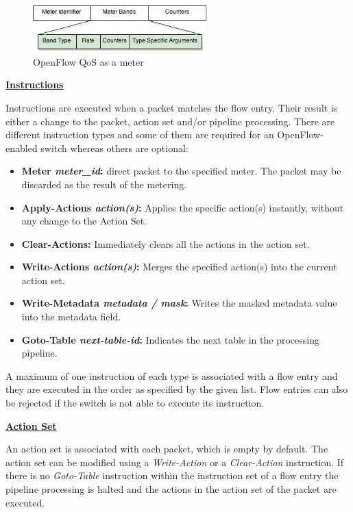 \begin{figure}[H]
\centering
\includegraphics[width=0.6\textwidth]{images/fundamentals/openflow_qos.png}
\caption{OpenFlow QoS as a meter}
\end{figure}


\underline{\textbf{Instructions}}

Instructions are executed when a packet matches the flow entry. Their result is either a change to the packet, action set and/or pipeline processing. There are different instruction types and some of them are required for an OpenFlow-enabled switch whereas others are optional:

\begin{itemize}
\item \textbf{Meter \textit{meter\_id}:} direct packet to the specified meter. The packet may be discarded as the result of the metering.
\item \textbf{Apply-Actions \textit{action(s)}:} Applies the specific action(s) instantly, without any change to the Action Set.
\item \textbf{Clear-Actions:} Immediately clears all the actions in the action set.
\item \textbf{Write-Actions \textit{action(s)}:} Merges the specified action(s) into the current action set.
\item \textbf{Write-Metadata \textit{metadata / mask}:} Writes the masked metadata value into the metadata field.
\item \textbf{Goto-Table \textit{next-table-id}:} Indicates the next table in the processing pipeline.
\end{itemize}

A maximum of one instruction of each type is associated with a flow entry and they are executed in the order as specified by the given list. Flow entries can also be rejected if the switch is not able to execute its instruction.


\underline{\textbf{Action Set}}

An action set is associated with each packet, which is empty by default. The action set can be modified using a \textit{Write-Action} or a \textit{Clear-Action} instruction. If there is no \textit{Goto-Table} instruction within the instruction set of a flow entry the pipeline processing is halted and the actions in the action set of the packet are executed.


